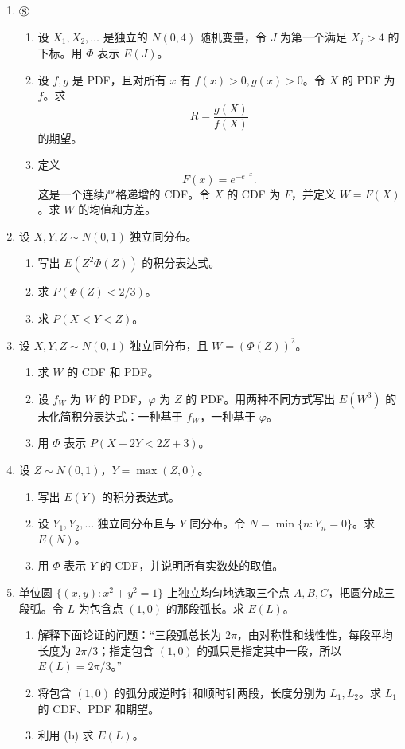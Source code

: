 \documentclass[UTF8,12pt,a4paper,fontset=fandol]{ctexart}
\begin{document}
\begin{enumerate}
  \item $\circledS$
  \begin{enumerate}
    \item 设 $X_1,X_2,\ldots$ 是独立的 $N(0,4)$ 随机变量，令 $J$ 为第一个满足 $X_j>4$ 的下标。用 $\Phi$ 表示 $E(J)$。
    \item 设 $f,g$ 是 PDF，且对所有 $x$ 有 $f(x)>0,g(x)>0$。令 $X$ 的 PDF 为 $f$。求
    \[
      R=\frac{g(X)}{f(X)}
    \]
    的期望。
    \item 定义
    \[
      F(x)=e^{-e^{-x}}.
    \]
    这是一个连续严格递增的 CDF。令 $X$ 的 CDF 为 $F$，并定义 $W=F(X)$。求 $W$ 的均值和方差。
  \end{enumerate}

  \item 设 $X,Y,Z\sim N(0,1)$ 独立同分布。
  \begin{enumerate}
    \item 写出 $E(Z^2\Phi(Z))$ 的积分表达式。
    \item 求 $P(\Phi(Z)<2/3)$。
    \item 求 $P(X<Y<Z)$。
  \end{enumerate}

  \item 设 $X,Y,Z\sim N(0,1)$ 独立同分布，且 $W=(\Phi(Z))^2$。
  \begin{enumerate}
    \item 求 $W$ 的 CDF 和 PDF。
    \item 设 $f_W$ 为 $W$ 的 PDF，$\varphi$ 为 $Z$ 的 PDF。用两种不同方式写出 $E(W^3)$ 的未化简积分表达式：一种基于 $f_W$，一种基于 $\varphi$。
    \item 用 $\Phi$ 表示 $P(X+2Y<2Z+3)$。
  \end{enumerate}

  \item 设 $Z\sim N(0,1)$，$Y=\max(Z,0)$。
  \begin{enumerate}
    \item 写出 $E(Y)$ 的积分表达式。
    \item 设 $Y_1,Y_2,\ldots$ 独立同分布且与 $Y$ 同分布。令 $N=\min\{n:Y_n=0\}$。求 $E(N)$。
    \item 用 $\Phi$ 表示 $Y$ 的 CDF，并说明所有实数处的取值。
  \end{enumerate}

  \item 单位圆 $\{(x,y):x^2+y^2=1\}$ 上独立均匀地选取三个点 $A,B,C$，把圆分成三段弧。令 $L$ 为包含点 $(1,0)$ 的那段弧长。求 $E(L)$。
  \begin{enumerate}
    \item 解释下面论证的问题：“三段弧总长为 $2\pi$，由对称性和线性性，每段平均长度为 $2\pi/3$；指定包含 $(1,0)$ 的弧只是指定其中一段，所以 $E(L)=2\pi/3$。”
    \item 将包含 $(1,0)$ 的弧分成逆时针和顺时针两段，长度分别为 $L_1,L_2$。求 $L_1$ 的 CDF、PDF 和期望。
    \item 利用 (b) 求 $E(L)$。
  \end{enumerate}


\end{enumerate}
\end{document}
